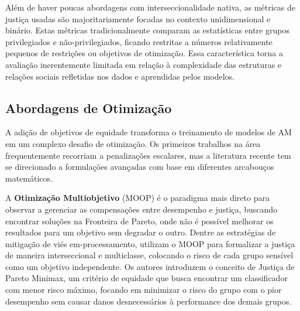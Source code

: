 Além de haver poucas abordagens com interseccionalidade nativa, as métricas de justiça usadas são majoritariamente focadas no contexto unidimensional e binário. Estas métricas tradicionalmente comparam as estatísticas entre grupos privilegiados e não-privilegiados, ficando restritas a números relativamente pequenos de restrições ou objetivos de otimização. Essa característica torna a avaliação inerentemente limitada em relação à complexidade das estruturas e relações sociais refletidas nos dados e aprendidas pelos modelos.


\subsection{Abordagens de Otimização}
A adição de objetivos de equidade transforma o treinamento de modelos de AM em um complexo desafio de otimização. Os primeiros trabalhos na área frequentemente recorriam a penalizações escalares, mas a literatura recente tem se direcionado a formulações avançadas com base em diferentes arcabouços matemáticos.

A \textbf{Otimização Multiobjetivo} (MOOP) é o paradigma mais direto para observar a gerenciar as compensações entre desempenho e justiça, buscando encontrar soluções na Fronteira de Pareto, onde não é possível melhorar os resultados para um objetivo sem degradar o outro. Dentre as estratégias de mitigação de viés em-processamento, \citet{martinez2020minimax} utilizam o MOOP para formalizar a justiça de maneira interseccional e multiclasse, colocando o risco de cada grupo sensível como um objetivo independente. Os autores introduzem o conceito de Justiça de Pareto Minimax, um critério de equidade que busca encontrar um classificador com menor risco máximo, focando em minimizar o risco do grupo com o pior desempenho sem causar danos desnecessários à performance dos demais grupos.

